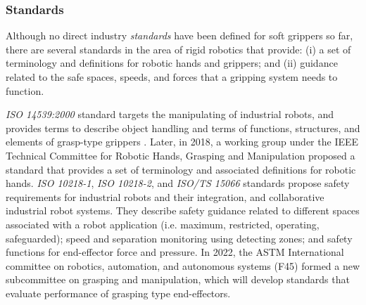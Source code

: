 \documentclass[lettersize,journal]{IEEEtran}
\begin{document}
\subsubsection{Standards}
Although no direct industry \emph{standards} have been defined for soft grippers so far, there are several standards in the area of rigid robotics that provide: (i) a set of terminology and definitions for robotic hands and grippers; and (ii) guidance related to the safe spaces, speeds, and forces that a gripping system needs to function. 

\emph{ISO 14539:2000} standard targets the manipulating of industrial robots, and provides terms to describe object handling and terms of functions, structures, and elements of grasp-type grippers \cite{ISO14539:2000}.
Later, in 2018, a working group under the IEEE Technical Committee for Robotic Hands, Grasping and Manipulation proposed a standard \cite{Falco2018} that provides a set of terminology and associated definitions for robotic hands. %
\emph{ISO 10218-1}, \emph{ISO 10218-2}, and \emph{ISO/TS 15066} standards propose safety requirements for industrial robots and their integration, and collaborative industrial robot systems. 
They describe safety guidance related to different spaces associated with a robot application (i.e. maximum, restricted, operating, safeguarded); speed and separation monitoring using detecting zones; and safety functions for end-effector force and pressure. 
In 2022, the ASTM International committee on robotics, automation, and autonomous systems (F45) formed a new subcommittee on grasping and manipulation, which will develop standards that evaluate performance of grasping type end-effectors.  

%
\end{document}
